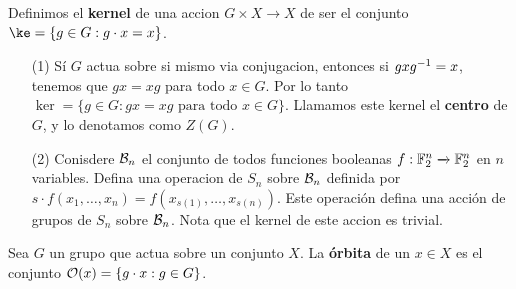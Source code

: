 \begin{definition}
    Definimos el \textbf{kernel} de una accion $G \times X \xrightarrow{} X$ de
    ser el conjunto $\ke=\{g \in G: g \cdot x=x\}$.
\end{definition}

\begin{example}\label{}
    \begin{enumerate}
        \item[(1)] S\'i $G$ actua sobre si mismo via conjugacion, entonces si
            $gxg^{-1}=x$,
            tenemos que $gx=xg$ para todo  $x \in G$. Por lo tanto  $\ker=\{g \in
                G : gx=xg \text{ para todo } x \in G\}$. Llamamos este kernel el
                \textbf{centro} de $G$, y lo denotamos como  $Z(G)$.

            \item[(2)] Conisdere $\mathcal{B}_n$ el conjunto de todos funciones
                booleanas  $f:\mathbb{F}_2^n \xrightarrow{} \mathbb{F}_2^n$ en $n$ variables.
                Defina una operacion de $S_n$ sobre  $\mathcal{B}_n$ definida por  $s
                \cdot f(x_1, \dots, x_n)=f(x_{s(1)}, \dots, x_{s(n)})$. Este
                operaci\'on defina una acci\'on de grupos de $S_n$ sobre
                $\mathcal{B}_n$. Nota que el kernel de este accion es trivial.
    \end{enumerate}
\end{example}

\begin{definition}
    Sea $G$ un grupo que actua sobre un conjunto $X$. La \textbf{\'orbita} de un
    $x \in X$ es el conjunto  $\mathcal{O}(x)=\{g \cdot x : g \in G\}$.
\end{definition}

